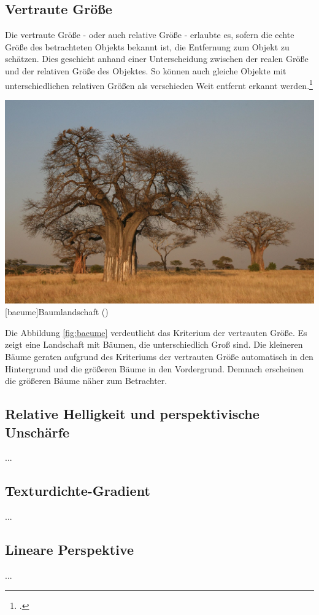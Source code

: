 \subsection{Vertraute Größe}
Die vertraute Größe - oder auch relative Größe - erlaubte es, sofern die echte Größe des betrachteten Objekts bekannt ist, die Entfernung zum Objekt zu schätzen. Dies geschieht anhand einer Unterscheidung zwischen der realen Größe und der relativen Größe des Objektes. So können auch gleiche Objekte mit unterschiedlichen relativen Größen als verschieden Weit entfernt erkannt werden.\footcite[Vgl.][S.43]{Ass16}

\vspace{1em}
\begin{minipage}{\linewidth}
	\centering
	\includegraphics[width=0.7\linewidth]{images/baeume.jpg}
	[baeume]{Baumlandschaft (\cite{yokyXX})}
	\label{fig:baeume}
\end{minipage}
\vspace{1em}

Die Abbildung \ref{fig:baeume} verdeutlicht das Kriterium der vertrauten Größe. Es zeigt eine Landschaft mit Bäumen, die unterschiedlich Groß sind. Die kleineren Bäume geraten aufgrund des Kriteriums der vertrauten Größe automatisch in den Hintergrund und die größeren Bäume in den Vordergrund. Demnach erscheinen die größeren Bäume näher zum Betrachter. 

\subsection{Relative Helligkeit und perspektivische Unschärfe}
...

\subsection{Texturdichte-Gradient}
...

\subsection{Lineare Perspektive}
...

